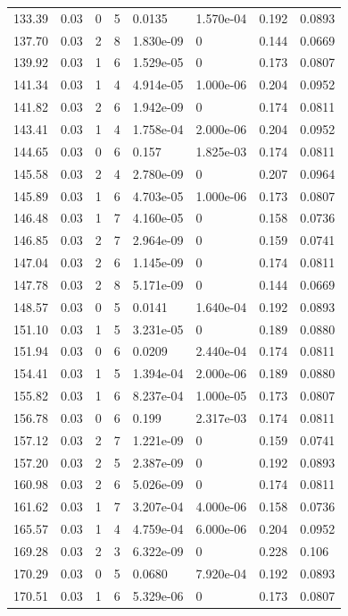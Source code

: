 \documentclass[preview]{standalone}
\begin{document}
{{{\begin{tabular}{L{1.2cm}C{1.2cm} C{0.3cm}C{0.5cm} C{1.4cm}C{1.4cm} C{1.4cm}C{1.4cm}}
  133.39  &  0.03  & 0     &  5 &  0.0135  & 1.570e-04  & 0.192 &  0.0893   \\ 
  137.70  &  0.03  & 2     &  8 &  1.830e-09  & 0  & 0.144 &  0.0669   \\ 
  139.92  &  0.03  & 1     &  6 &  1.529e-05  & 0  & 0.173 &  0.0807   \\ 
  141.34  &  0.03  & 1     &  4 &  4.914e-05  & 1.000e-06  & 0.204 &  0.0952   \\ 
  141.82  &  0.03  & 2     &  6 &  1.942e-09  & 0  & 0.174 &  0.0811   \\ 
  143.41  &  0.03  & 1     &  4 &  1.758e-04  & 2.000e-06  & 0.204 &  0.0952   \\ 
  144.65  &  0.03  & 0     &  6 &  0.157  & 1.825e-03  & 0.174 &  0.0811   \\ 
  145.58  &  0.03  & 2     &  4 &  2.780e-09  & 0  & 0.207 &  0.0964   \\ 
  145.89  &  0.03  & 1     &  6 &  4.703e-05  & 1.000e-06  & 0.173 &  0.0807   \\ 
  146.48  &  0.03  & 1     &  7 &  4.160e-05  & 0  & 0.158 &  0.0736   \\ 
  146.85  &  0.03  & 2     &  7 &  2.964e-09  & 0  & 0.159 &  0.0741   \\ 
  147.04  &  0.03  & 2     &  6 &  1.145e-09  & 0  & 0.174 &  0.0811   \\ 
  147.78  &  0.03  & 2     &  8 &  5.171e-09  & 0  & 0.144 &  0.0669   \\ 
  148.57  &  0.03  & 0     &  5 &  0.0141  & 1.640e-04  & 0.192 &  0.0893   \\ 
  151.10  &  0.03  & 1     &  5 &  3.231e-05  & 0  & 0.189 &  0.0880   \\ 
  151.94  &  0.03  & 0     &  6 &  0.0209  & 2.440e-04  & 0.174 &  0.0811   \\ 
  154.41  &  0.03  & 1     &  5 &  1.394e-04  & 2.000e-06  & 0.189 &  0.0880   \\ 
  155.82  &  0.03  & 1     &  6 &  8.237e-04  & 1.000e-05  & 0.173 &  0.0807   \\ 
  156.78  &  0.03  & 0     &  6 &  0.199  & 2.317e-03  & 0.174 &  0.0811   \\ 
  157.12  &  0.03  & 2     &  7 &  1.221e-09  & 0  & 0.159 &  0.0741   \\ 
  157.20  &  0.03  & 2     &  5 &  2.387e-09  & 0  & 0.192 &  0.0893   \\ 
  160.98  &  0.03  & 2     &  6 &  5.026e-09  & 0  & 0.174 &  0.0811   \\ 
  161.62  &  0.03  & 1     &  7 &  3.207e-04  & 4.000e-06  & 0.158 &  0.0736   \\ 
  165.57  &  0.03  & 1     &  4 &  4.759e-04  & 6.000e-06  & 0.204 &  0.0952   \\ 
  169.28  &  0.03  & 2     &  3 &  6.322e-09  & 0  & 0.228 &  0.106   \\ 
  170.29  &  0.03  & 0     &  5 &  0.0680  & 7.920e-04  & 0.192 &  0.0893   \\ 
  170.51  &  0.03  & 1     &  6 &  5.329e-06  & 0  & 0.173 &  0.0807   \\ 
\hline 
\end{tabular} 

}}}
\end{document}
